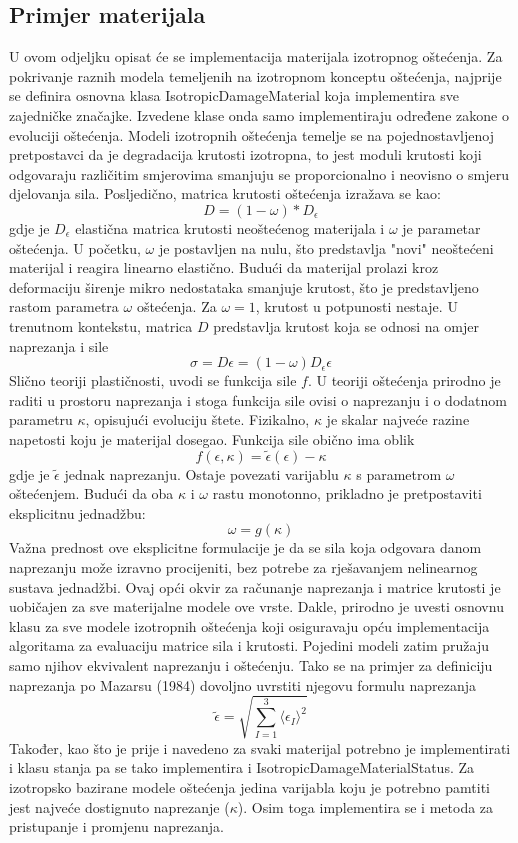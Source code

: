 \documentclass[a4paper,twoside,12pt]{memoir} %
\begin{document}
\subsection{Primjer materijala}
U ovom odjeljku opisat će se implementacija materijala izotropnog oštećenja. Za pokrivanje raznih modela temeljenih na izotropnom konceptu oštećenja, najprije se definira osnovna klasa IsotropicDamageMaterial koja implementira sve zajedničke značajke. Izvedene klase onda samo implementiraju određene zakone o evoluciji oštećenja.
Modeli izotropnih oštećenja temelje se na pojednostavljenoj pretpostavci da je degradacija krutosti izotropna, to jest moduli krutosti koji odgovaraju različitim smjerovima smanjuju se proporcionalno i neovisno o smjeru djelovanja sila. Posljedično, matrica krutosti oštećenja izražava se kao:
$$ D = (1 - \omega) * D_\epsilon$$
gdje je $D_\epsilon$ elastična matrica krutosti neoštećenog materijala i $\omega$ je parametar oštećenja. U početku, $\omega$ je postavljen na nulu, što predstavlja "novi" neoštećeni materijal i reagira linearno elastično. Budući da materijal prolazi kroz deformaciju širenje mikro nedostataka smanjuje krutost, što je predstavljeno rastom parametra $\omega$ oštećenja. Za $\omega = 1$, krutost u potpunosti nestaje. U trenutnom kontekstu, matrica $D$ predstavlja krutost koja se odnosi na omjer naprezanja i sile
$$\sigma = D \epsilon = (1 - \omega) D_\epsilon \epsilon$$
Slično teoriji plastičnosti, uvodi se funkcija sile $f$. U teoriji oštećenja prirodno je raditi u prostoru naprezanja i stoga funkcija sile ovisi o naprezanju i o dodatnom parametru $\kappa$, opisujući evoluciju štete. Fizikalno, $\kappa$ je skalar najveće razine napetosti koju je materijal dosegao. Funkcija sile obično ima oblik 
$$f(\epsilon, \kappa) = \widetilde{\epsilon} (\epsilon) - \kappa$$
gdje je $\widetilde{\epsilon}$ jednak naprezanju. Ostaje povezati varijablu $\kappa$ s parametrom $\omega$ oštećenjem. Budući da oba $\kappa$ i $\omega$ rastu monotonno, prikladno je pretpostaviti eksplicitnu jednadžbu:
$$ \omega = g(\kappa) $$
Važna prednost ove eksplicitne formulacije je da se sila koja odgovara danom naprezanju može izravno procijeniti, bez potrebe za rješavanjem nelinearnog sustava jednadžbi.
Ovaj opći okvir za računanje naprezanja i matrice krutosti je uobičajen za sve materijalne modele ove vrste. Dakle, prirodno je uvesti osnovnu klasu za sve modele izotropnih oštećenja koji osiguravaju opću
implementacija algoritama za evaluaciju matrice sila i krutosti. Pojedini modeli zatim pružaju samo njihov ekvivalent naprezanju i oštećenju. Tako se na primjer za definiciju naprezanja po Mazarsu (1984) dovoljno uvrstiti njegovu formulu naprezanja
$$ \widetilde{\epsilon} = \sqrt{\sum^3_{I=1} \langle \epsilon_I \rangle^2 }$$
Također, kao što je prije i navedeno za svaki materijal potrebno je implementirati i klasu stanja pa se tako implementira i IsotropicDamageMaterialStatus. Za izotropsko bazirane modele oštećenja jedina varijabla koju je potrebno pamtiti jest najveće dostignuto naprezanje ($\kappa$). Osim toga implementira se i metoda za pristupanje i promjenu naprezanja.
\end{document}
